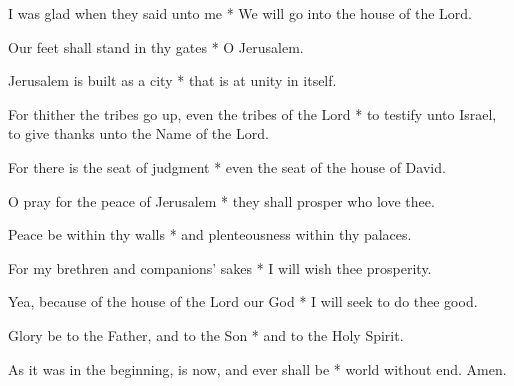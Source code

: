 I was glad when they said unto me * We will go into the house of the Lord.

Our feet shall stand in thy gates * O Jerusalem.

Jerusalem is built as a city * that is at unity in itself.

For thither the tribes go up, even the tribes of the Lord * to testify unto Israel, to give thanks unto the Name of the Lord.

For there is the seat of judgment * even the seat of the house of David.

O pray for the peace of Jerusalem * they shall prosper who love thee.

Peace be within thy walls * and plenteousness within thy palaces.

For my brethren and companions' sakes * I will wish thee prosperity.

Yea, because of the house of the Lord our God * I will seek to do thee good.

Glory be to the Father, and to the Son * and to the Holy Spirit.

As it was in the beginning, is now, and ever shall be * world without end. Amen.